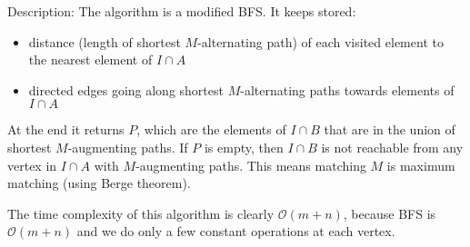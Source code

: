 \begin{exercise}{2}
\begin{enumerate}[i)]
{\begin{algorithmic}


            \end{algorithmic}

            Description:
            The algorithm is a modified BFS. It keeps stored:
            \begin{itemize}
                \item{distance (length of shortest $M$-alternating path) of each
                    visited element to the nearest element of $I \cap A$}
                \item{directed edges going along shortest $M$-alternating paths
                    towards elements of $I \cap A$}
            \end{itemize}
            At the end it returns $P$, which are the elements of $I \cap B$ that
            are in the union of shortest $M$-augmenting paths. If $P$ is empty,
            then $I \cap B$ is not reachable from any vertex in $I \cap A$ with
            $M$-augmenting paths. This means matching $M$ is maximum matching
            (using Berge theorem).

            The time complexity of this algorithm is clearly $\mathcal{O}(m +
            n)$, because BFS is $\mathcal{O}(m + n)$ and we do only a few
            constant operations at each vertex.


}
\end{enumerate}
\end{exercise}
